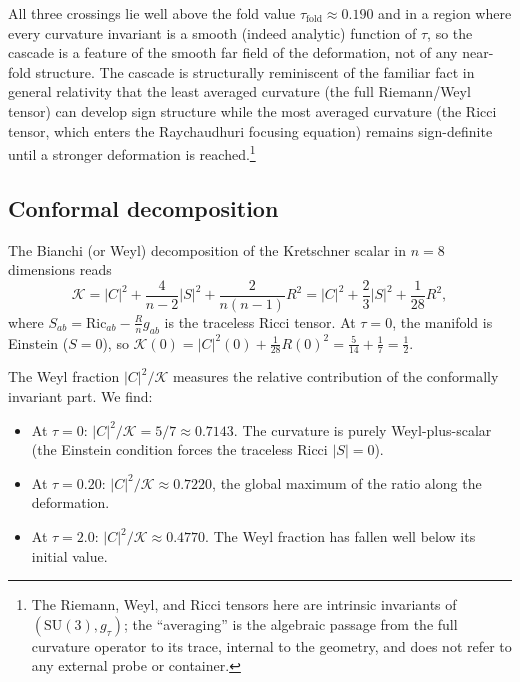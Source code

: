 \documentclass[12pt]{article}
\theoremstyle{definition}
\theoremstyle{remark}
\begin{document}
All three crossings lie well above the fold value $\tau_{\mathrm{fold}}\approx0.190$ and in a region where every curvature invariant is a smooth (indeed analytic) function of $\tau$, so the cascade is a feature of the smooth far field of the deformation, not of any near-fold structure.  The cascade is structurally reminiscent of the familiar fact in general relativity that the least averaged curvature (the full Riemann/Weyl tensor) can develop sign structure while the most averaged curvature (the Ricci tensor, which enters the Raychaudhuri focusing equation) remains sign-definite until a stronger deformation is reached.\footnote{The Riemann, Weyl, and Ricci tensors here are intrinsic invariants of $(\mathrm{SU}(3),g_\tau)$; the ``averaging'' is the algebraic passage from the full curvature operator to its trace, internal to the geometry, and does not refer to any external probe or container.}

\subsection{Conformal decomposition}

The Bianchi (or Weyl) decomposition of the Kretschner scalar in $n=8$ dimensions reads
\begin{equation}
\label{eq:bianchi}
\mathcal{K} = |C|^2 + \frac{4}{n-2}|S|^2 + \frac{2}{n(n-1)}R^2 = |C|^2 + \frac{2}{3}|S|^2 + \frac{1}{28}R^2,
\end{equation}
where $S_{ab}=\mathrm{Ric}_{ab}-\frac{R}{n}g_{ab}$ is the traceless Ricci tensor.  At $\tau=0$, the manifold is Einstein ($S=0$), so $\mathcal{K}(0)=|C|^2(0)+\frac{1}{28}R(0)^2=\frac{5}{14}+\frac{1}{7}=\frac{1}{2}$.

The Weyl fraction $|C|^2/\mathcal{K}$ measures the relative contribution of the conformally invariant part.  We find:

\begin{itemize}
    \item At $\tau=0$: $|C|^2/\mathcal{K}=5/7\approx 0.7143$.  The curvature is purely Weyl-plus-scalar (the Einstein condition forces the traceless Ricci $|S|=0$).
    \item At $\tau=0.20$: $|C|^2/\mathcal{K}\approx 0.7220$, the global maximum of the ratio along the deformation.
    \item At $\tau=2.0$: $|C|^2/\mathcal{K}\approx 0.4770$.  The Weyl fraction has fallen well below its initial value.
\end{itemize}
\end{document}
